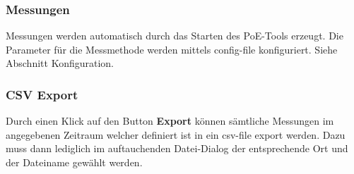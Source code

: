 \subsubsection{Messungen}

Messungen werden automatisch durch das Starten des PoE-Tools erzeugt. Die
Parameter für die Messmethode werden mittels config-file konfiguriert. Siehe Abschnitt Konfiguration.

\subsubsection{CSV Export}

Durch einen Klick auf den Button \textbf{Export} können sämtliche Messungen im
angegebenen Zeitraum welcher definiert ist in ein csv-file export werden. Dazu
muss dann lediglich im auftauchenden Datei-Dialog der entsprechende Ort und der
Dateiname gewählt werden.
